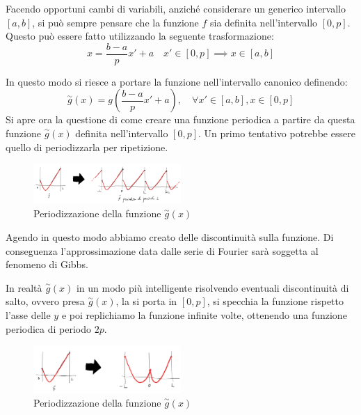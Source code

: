 Facendo opportuni cambi di variabili, anziché considerare un generico intervallo
$[a, b]$, si può sempre pensare che la funzione $f$ sia definita nell'intervallo
$[0, p]$. Questo può essere fatto utilizzando la seguente trasformazione:
\begin{equation}
    x = \frac{b - a}{p} x' + a \quad x' \in [0, p] \implies x \in [a, b]
\end{equation}

In questo modo si riesce a portare la funzione nell'intervallo canonico definendo:
\begin{equation*}
    \stackrel{\sim}{g}(x) = g\left(\frac{b-a}{p}x'+a\right), \quad \forall x' \in [a,b], x \in [0,p]
\end{equation*}
Si apre ora la questione di come creare una funzione periodica a partire da questa
funzione $\stackrel{\sim}{g}(x)$ definita nell'intervallo $[0, p]$. Un primo
tentativo potrebbe essere quello di periodizzarla per ripetizione.
\begin{figure}[!ht]
    \centering
    \includegraphics[width=0.5\textwidth]{img/Serie/ripetizione.png}
    \caption{Periodizzazione della funzione $\stackrel{\sim}{g}(x)$}
    \label{fig:ripetizione}
\end{figure}

Agendo in questo modo abbiamo creato delle discontinuità sulla funzione. Di conseguenza
l'approssimazione data dalle serie di Fourier sarà soggetta al fenomeno di Gibbs.

In realtà $\stackrel{\sim}{g}(x)$ in un modo più intelligente risolvendo eventuali
discontinuità di salto, ovvero presa $\stackrel{\sim}{g}(x)$, la si porta in $[0,p]$,
si specchia la funzione rispetto l'asse delle $y$ e poi replichiamo la funzione
infinite volte, ottenendo una funzione periodica di periodo $2p$.
\begin{figure}[!ht]
    \centering
    \includegraphics[width=0.5\textwidth]{img/Serie/specchio.png}
    \caption{Periodizzazione della funzione $\stackrel{\sim}{g}(x)$}
    \label{fig:specchio}
\end{figure}

